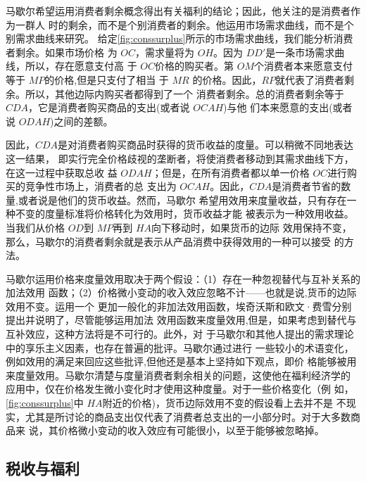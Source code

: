 马歇尔希望运用消费者剩余概念得出有关福利的结论；因此，他关注的是消费者作为一群人
时的剩余，而不是个别消费者的剩余。他运用市场需求曲线，而不是个别需求曲线来研究。
给定\cref{fig:conssurplus}所示的市场需求曲线，我们能分析消费者剩余。如果市场价格
为 $OC$，需求量将为 $OH$。因为 $DD'$是一条市场需求曲线，所以，存在愿意支付高
于 $OC$价格的购买者。第 $OM$个消费者本来愿意支付等于 $MP$的价格,但是只支付了相当
于 $MR$ 的价格。因此，$RP$就代表了消费者剩余。所以，其他边际内购买者都得到了一个
消费者剩余。总的消费者剩余等于 $CDA$，它是消费者购买商品的支出(或者说 $OCAH$)与他
们本来愿意的支出(或者说 $ODAH$)之间的差额。

因此，$CDA$是对消费者购买商品时获得的货币收益的度量。可以稍微不同地表达这一结果，
即实行完全价格歧视的垄断者，将使消费者移动到其需求曲线下方，在这一过程中获取总收
益 $ODAH$；但是，在所有消费者都以单一价格 $OC$进行购买的竞争性市场上，消费者的总
支出为 $OCAH$。因此，$CDA$是消费者节省的数量,或者说是他们的货币收益。然而，马歇尔
希望用效用来度量收益，只有存在一种不变的度量标准将价格转化为效用时，货币收益才能
被表示为一种效用收益。当我们从价格 $OD$到 $MP$再到 $HA$向下移动时，如果货币的边际
效用保持不变，那么，马歇尔的消费者剩余就是表示从产品消费中获得效用的一种可以接受
的方法。

马歇尔运用价格来度量效用取决于两个假设：（1）存在一种忽视替代与互补关系的加法效用
函数；（2）价格微小变动的收入效应忽略不计——也就是说,货币的边际效用不变。运用一个
更加一般化的非加法效用函数，埃奇沃斯和欧文·费雪分别提出并说明了，尽管能够运用加法
效用函数来度量效用,但是，如果考虑到替代与互补效应，这种方法将是不可行的。此外，对
于马歇尔和其他人提出的需求理论中的享乐主义因素，也存在普遍的批评。马歇尔通过进行
一些较小的术语变化，例如效用的满足来回应这些批评,但他还是基本上坚持如下观点，即价
格能够被用来度量效用。马歇尔清楚与度量消费者剩余相关的问题，这使他在福利经济学的
应用中，仅在价格发生微小变化时才使用这种度量。对于一些价格变化（例
如，\cref{fig:conssurplus}中 $HA$附近的价格)，货币边际效用不变的假设看上去并不是
不现实，尤其是所讨论的商品支出仅代表了消费者总支出的一小部分时。对于大多数商品来
说，其价格微小变动的收入效应有可能很小，以至于能够被忽略掉。

\subsection{税收与福利}

